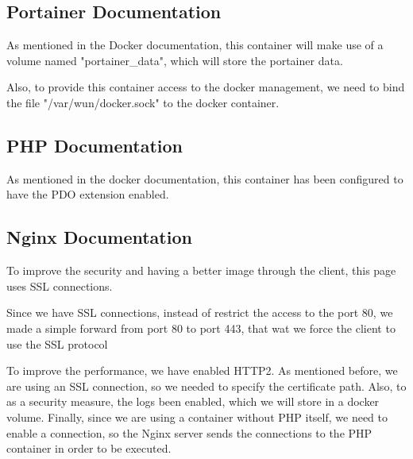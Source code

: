\subsection{Portainer Documentation}\label{subsec:portainer-documentation}

\begin{flushleft}
    As mentioned in the Docker documentation, this container will make use of a volume named "portainer\_data", which
    will store the portainer data.
\end{flushleft}
\begin{flushleft}
    Also, to provide this container access to the docker management, we need to bind the file "/var/wun/docker.sock"
    to the docker container.
\end{flushleft}

\subsection{PHP Documentation}\label{subsec:PHH-documentation}
\begin{flushleft}
    As mentioned in the docker documentation, this container has been configured to have the PDO extension enabled.
\end{flushleft}
\subsection{Nginx Documentation}\label{subsec:nginx-documentation}

\begin{flushleft}
    To improve the security and having a better image through the client, this page uses SSL connections.
\end{flushleft}

\begin{flushleft}
    Since we have SSL connections, instead of restrict the access to the port 80, we made a simple forward from port 80
    to port 443, that wat we force the client to use the SSL protocol
\end{flushleft}

\begin{flushleft}
    To improve the performance, we have enabled HTTP2.
    As mentioned before, we are using an SSL connection, so we needed to specify the certificate path.
    Also, to as a security measure, the logs been enabled, which we will store in a docker volume.
    Finally, since we are using a container without PHP itself, we need to enable a connection, so the Nginx server sends
    the connections to the PHP container in order to be executed.
\end{flushleft}


